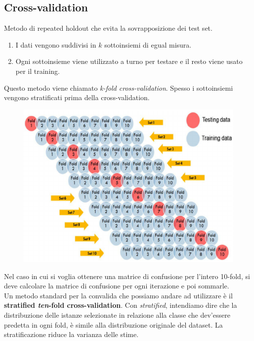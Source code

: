 \subsection{Cross-validation}
Metodo di repeated holdout che evita la sovrapposizione dei test set.
\begin{enumerate}
    \item I dati vengono suddivisi in $k$ sottoinsiemi di egual misura.
    \item Ogni sottoinsieme viene utilizzato a turno per testare e il resto viene usato per il training.
\end{enumerate}
Questo metodo viene chiamato \textit{k-fold cross-validation}. Spesso i sottoinsiemi vengono stratificati prima della cross-validation.

\begin{figure}[H]
    \centering
    \includegraphics[scale=0.4]{imm/cross_validation.png}
    \label{fig:cross_validation}
\end{figure}

Nel caso in cui si voglia ottenere una matrice di confusione per l’intero 10-fold, si deve calcolare la matrice di confusione per ogni iterazione e poi sommarle.\\
Un metodo standard per la convalida che possiamo andare ad utilizzare è il \textbf{stratified \textit{ten}-fold cross-validation}.  
Con \textit{stratified}, intendiamo dire che la distribuzione delle istanze selezionate in relazione alla classe che dev’essere predetta in ogni fold, è simile alla distribuzione originale del dataset. La stratificazione riduce la varianza delle stime.\\


